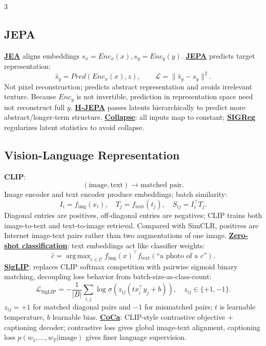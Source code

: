\documentclass{article}
\numberwithin{equation}{subsection}
\newcommand{\key}[1]{\textbf{#1}}
\newcommand{\lowterm}[1]{\textbf{\underline{#1}}}
\DeclareMathOperator*{\argmax}{arg\,max}
\begin{document}
\begin{multicols*}{3}
\subsection{JEPA}
\lowterm{JEA} aligns embeddings $s_x=Enc_x(x),s_y=Enc_y(y)$. \lowterm{JEPA} predicts target representation:
\[
\hat s_y=Pred(Enc_x(x),z),\qquad \mathcal L=\|\hat s_y-s_y\|^2.
\]
Not pixel reconstruction; predicts abstract representation and avoids irrelevant texture. Because $Enc_y$ is not invertible, prediction in representation space need not reconstruct full $y$. \lowterm{H-JEPA} passes latents hierarchically to predict more abstract/longer-term structure. \lowterm{Collapse}: all inputs map to constant; \lowterm{SIGReg} regularizes latent statistics to avoid collapse.

\subsection{Vision-Language Representation}

\key{CLIP}: 
\[
(\text{image},\text{text})\to\text{matched pair}.
\]
Image encoder and text encoder produce embeddings; batch similarity:
\[
I_i=f_{\mathrm{img}}(x_i),\quad T_j=f_{\mathrm{text}}(t_j),\quad S_{ij}=I_i^\top T_j.
\]
Diagonal entries are positives, off-diagonal entries are negatives; CLIP trains both image-to-text and text-to-image retrieval. Compared with SimCLR, positives are Internet image-text pairs rather than two augmentations of one image. \lowterm{Zero-shot classification}: text embeddings act like classifier weights:
\[
\hat c=\argmax_{c\in\mathcal C} f_{\mathrm{img}}(x)^\top f_{\mathrm{text}}(\text{``a photo of a }c\text{''}).
\]
\lowterm{SigLIP}: replaces CLIP softmax competition with pairwise sigmoid binary matching, decoupling loss behavior from batch-size-as-class-count:
\[
\mathcal L_{\mathrm{SigLIP}}=-\frac1{|B|}\sum_{i,j}\log\sigma\!\left(z_{ij}(t x_i^\top y_j+b)\right),\quad z_{ij}\in\{+1,-1\}.
\]
$z_{ij}=+1$ for matched diagonal pairs and $-1$ for mismatched pairs; $t$ is learnable temperature, $b$ learnable bias. \lowterm{CoCa}: CLIP-style contrastive objective + captioning decoder; contrastive loss gives global image-text alignment, captioning loss $p(w_1,\ldots,w_T|\text{image})$ gives finer language supervision.



\end{multicols*}
\end{document}
